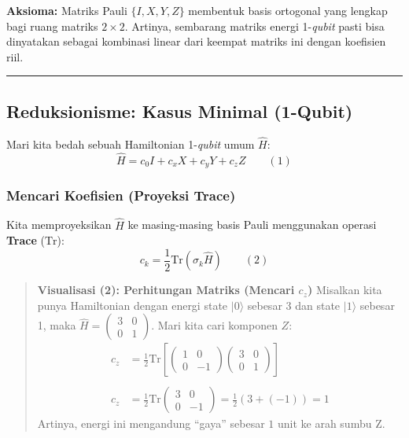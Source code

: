 \textbf{Aksioma:} Matriks Pauli \(\{I, X, Y, Z\}\) membentuk basis ortogonal yang lengkap bagi ruang matriks \(2 \times 2\). Artinya, sembarang matriks energi 1-\emph{qubit} pasti bisa dinyatakan sebagai kombinasi linear dari keempat matriks ini dengan koefisien riil.

\begin{center}\rule{0.5\linewidth}{0.5pt}\end{center}

\hypertarget{reduksionisme-kasus-minimal-1-qubit}{%
\subsection{Reduksionisme: Kasus Minimal (1-Qubit)}\label{reduksionisme-kasus-minimal-1-qubit}}

Mari kita bedah sebuah Hamiltonian 1-\emph{qubit} umum \(\hat{H}\): \[ \hat{H} = c_0 I + c_x X + c_y Y + c_z Z \qquad (1) \]

\hypertarget{a.-mencari-koefisien-proyeksi-trace}{%
\subsubsection{Mencari Koefisien (Proyeksi Trace)}\label{a.-mencari-koefisien-proyeksi-trace}}

Kita memproyeksikan \(\hat{H}\) ke masing-masing basis Pauli menggunakan operasi \textbf{Trace} (\(\text{Tr}\)): \[ c_k = \frac{1}{2} \text{Tr}(\sigma_k \hat{H}) \qquad (2) \]

\begin{quote}
\textbf{Visualisasi (2): Perhitungan Matriks (Mencari \(c_z\))} Misalkan kita punya Hamiltonian dengan energi state \(|0\rangle\) sebesar 3 dan state \(|1\rangle\) sebesar 1, maka \(\hat{H} = \begin{pmatrix} 3 & 0 \\ 0 & 1 \end{pmatrix}\). Mari kita cari komponen \(Z\): \[ 
\begin{split}
c_z &= \frac{1}{2} \text{Tr} \left[ \begin{pmatrix} 1 & 0 \\ 0 & -1 \end{pmatrix} \begin{pmatrix} 3 & 0 \\ 0 & 1 \end{pmatrix} \right] \\\\
c_z &= \frac{1}{2} \text{Tr} \begin{pmatrix} 3 & 0 \\ 0 & -1 \end{pmatrix} = \frac{1}{2} (3 + (-1)) = 1
\end{split}
\] Artinya, energi ini mengandung ``gaya'' sebesar \(1\) unit ke arah sumbu Z.
\end{quote}

